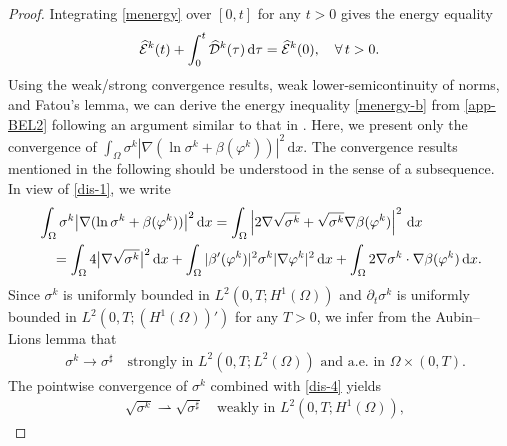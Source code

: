 \documentclass[11pt,reqno]{amsart}
\def\d{{\rm d}}
\begin{document}
\begin{proof}
 Integrating \eqref{menergy} over $[0,t]$ for any $t>0$ gives the energy equality
 \begin{align}
 \widehat{\mathcal{E}}^k(t)+ \int_0^t \widehat{\mathcal{D}}^k(\tau)\,\d \tau=\widehat{\mathcal{E}}^k(0),\quad \forall\, t>0.
 \label{app-BEL2}
 \end{align}
Using the weak/strong convergence results, weak lower-semicontinuity of norms, and Fatou's lemma, we can derive the energy inequality \eqref{menergy-b} from \eqref{app-BEL2} following an argument similar to that in \cite[Section 4.1]{Frigeri2016}. Here, we present only the convergence of $\int_\Omega \sigma^k|\nabla(\ln \sigma^k+ \beta(\varphi^k))|^{2}\, \mathrm{d} x$. The convergence results mentioned in the following should be understood in the sense of a subsequence.
%
In view of \eqref{dis-1}, we write
%
\begin{align*}
& \int_\Omega  \sigma^k \big|\nabla(\ln \sigma^k+ \beta(\varphi^k))\big|^{2}\, \mathrm{d} x
= \int_\Omega \left| 2\nabla \sqrt{\sigma^k} + \sqrt{\sigma^k} \nabla \beta(\varphi^k) \right|^2 \, \mathrm{d}x
\notag\\
&\quad =
\int_\Omega 4\big|\nabla \sqrt{\sigma^k}\big|^2 \, \d x
+ \int_\Omega |\beta'(\varphi^k)|^2 \sigma^k |\nabla \varphi^k|^2 \, \d x
+ \int_{\Omega} 2 \nabla \sigma^k \cdot \nabla \beta(\varphi^k) \, \d x.
\end{align*}
%
Since $\sigma^k$ is uniformly bounded in $L^2(0,T;H^1(\Omega))$ and $\partial_t \sigma^k$ is uniformly bounded in $L^2(0,T;(H^1(\Omega))')$ for any $T>0$, we infer from the Aubin--Lions lemma that
%
\begin{align*}
&\sigma^k \rightarrow \sigma^{\sharp} \quad \text{strongly in } L^2(0,T; L^2(\Omega)) \text{ and  a.e. in } \Omega \times (0,T).
\end{align*}
%
The pointwise convergence of $\sigma^k$ combined with \eqref{dis-4} yields
%
\begin{align*}
&\sqrt{\sigma^k} \rightharpoonup \sqrt{\sigma^{\sharp}}\quad \text{weakly in } L^2(0,T; H^1(\Omega)),
\end{align*}

\end{proof}
\end{document}
